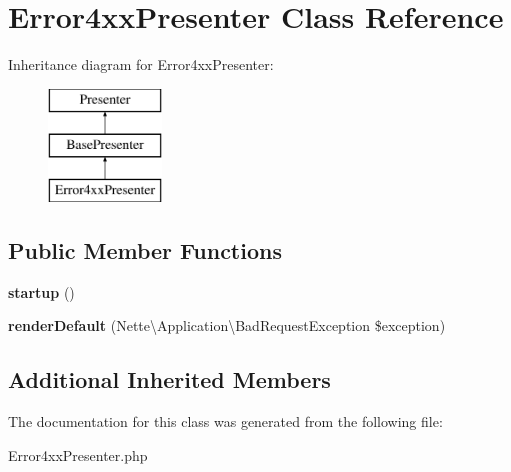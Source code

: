 \hypertarget{class_app_1_1_presenters_1_1_error4xx_presenter}{}\section{Error4xx\+Presenter Class Reference}
\label{class_app_1_1_presenters_1_1_error4xx_presenter}
Inheritance diagram for Error4xx\+Presenter\+:\begin{figure}[H]
\begin{center}
\leavevmode
\includegraphics[height=3.000000cm]{class_app_1_1_presenters_1_1_error4xx_presenter}
\end{center}
\end{figure}
\subsection*{Public Member Functions}
\begin{DoxyCompactItemize}
\item 
\mbox{\label{class_app_1_1_presenters_1_1_error4xx_presenter_aca47505b8732177f52bb2d647eb2741c}} 
{\bfseries startup} ()
\item 
\mbox{\label{class_app_1_1_presenters_1_1_error4xx_presenter_a57df1339c0adc6203f2e02bcddc435aa}} 
{\bfseries render\+Default} (Nette\textbackslash{}\+Application\textbackslash{}\+Bad\+Request\+Exception \$exception)
\end{DoxyCompactItemize}
\subsection*{Additional Inherited Members}


The documentation for this class was generated from the following file\+:\begin{DoxyCompactItemize}
\item 
Error4xx\+Presenter.\+php\end{DoxyCompactItemize}
